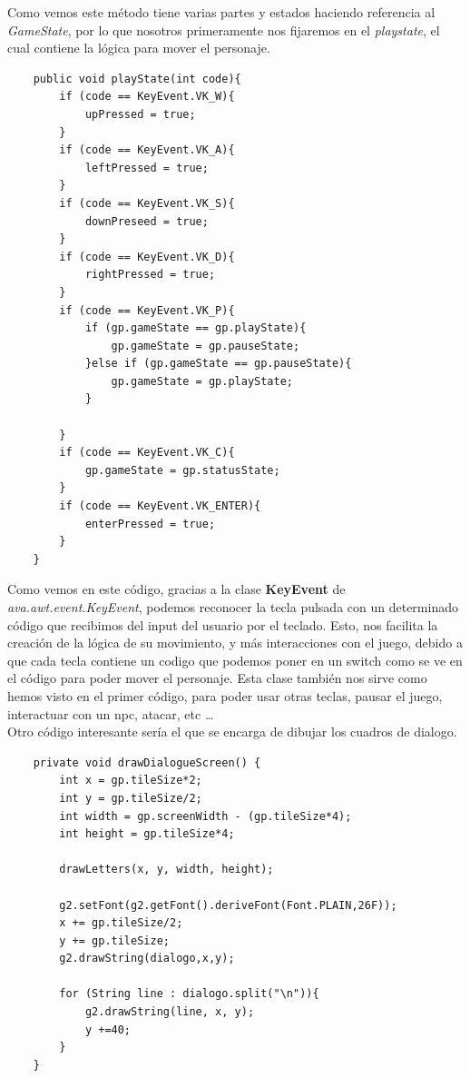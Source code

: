 \documentclass[a4paper]{article}
\begin{document}
Como vemos este método tiene varias partes y estados haciendo referencia al \textit{GameState}, por lo que nosotros primeramente nos fijaremos en el \textit{playstate}, el cual contiene la lógica para mover el personaje.
\begin{lstlisting}
    public void playState(int code){
        if (code == KeyEvent.VK_W){
            upPressed = true;
        }
        if (code == KeyEvent.VK_A){
            leftPressed = true;
        }
        if (code == KeyEvent.VK_S){
            downPreseed = true;
        }
        if (code == KeyEvent.VK_D){
            rightPressed = true;
        }
        if (code == KeyEvent.VK_P){
            if (gp.gameState == gp.playState){
                gp.gameState = gp.pauseState;
            }else if (gp.gameState == gp.pauseState){
                gp.gameState = gp.playState;
            }

        }
        if (code == KeyEvent.VK_C){
            gp.gameState = gp.statusState;
        }
        if (code == KeyEvent.VK_ENTER){
            enterPressed = true;
        }
    }
\end{lstlisting}
Como vemos en este código, gracias a la clase \textbf{KeyEvent} de \textit{ava.awt.event.KeyEvent}, podemos reconocer la tecla pulsada con un determinado código que recibimos del input del usuario por el teclado. Esto,
nos facilita la creación de la lógica de su movimiento, y más interacciones con el juego, debido a que cada tecla contiene un codigo que podemos poner en un switch como se ve en el código para poder mover el personaje.
Esta clase también nos sirve como hemos visto en el primer código, para poder usar otras teclas, pausar el juego, interactuar con un npc, atacar, etc \dots \\
Otro código interesante sería el que se encarga de dibujar los cuadros de dialogo.
\begin{lstlisting}
    private void drawDialogueScreen() {
        int x = gp.tileSize*2;
        int y = gp.tileSize/2;
        int width = gp.screenWidth - (gp.tileSize*4);
        int height = gp.tileSize*4;

        drawLetters(x, y, width, height);

        g2.setFont(g2.getFont().deriveFont(Font.PLAIN,26F));
        x += gp.tileSize/2;
        y += gp.tileSize;
        g2.drawString(dialogo,x,y);

        for (String line : dialogo.split("\n")){
            g2.drawString(line, x, y);
            y +=40;
        }
    }
\end{lstlisting}
\end{document}
